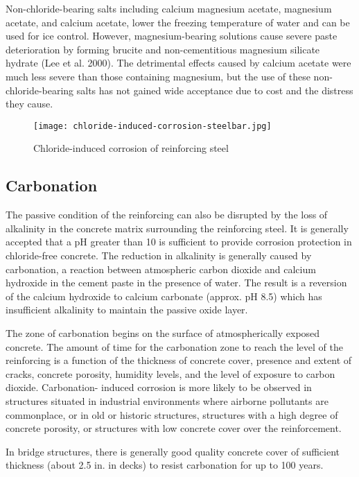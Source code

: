 Non-chloride-bearing salts including calcium magnesium acetate, magnesium acetate, and calcium acetate, lower
the freezing temperature of water and can be used for ice control.
 However, magnesium-bearing solutions cause
severe paste deterioration by forming brucite and non-cementitious magnesium silicate hydrate (Lee et al. 2000).
The detrimental effects caused by calcium acetate were much less severe than those containing magnesium, but the
use of these non-chloride-bearing salts has not gained wide acceptance due to cost and the distress they cause.

\begin{figure}
  \texttt{[image: chloride-induced-corrosion-steelbar.jpg]}
  \caption{Chloride-induced corrosion of reinforcing steel}
  \label{fig:chloride-induced-corrosion-steelbar}
\end{figure}
\subsection{Carbonation}
The passive condition of the reinforcing can also be disrupted by the loss of alkalinity in the concrete matrix
surrounding the reinforcing steel. It is generally accepted that a pH greater than 10 is sufficient to provide corrosion
protection in chloride-free concrete. The reduction in alkalinity is generally caused by carbonation, a reaction between atmospheric carbon dioxide and calcium hydroxide in the cement paste in the presence of water. The result
is a reversion of the calcium hydroxide to calcium carbonate (approx. pH 8.5) which has insufficient alkalinity to
maintain the passive oxide layer.

The zone of carbonation begins on the surface of atmospherically exposed concrete. The amount of time for the
carbonation zone to reach the level of the reinforcing is a function of the thickness of concrete cover, presence and
extent of cracks, concrete porosity, humidity levels, and the level of exposure to carbon dioxide.
 Carbonation-
induced corrosion is more likely to be observed in structures situated in industrial environments where airborne
pollutants are commonplace, or in old or historic structures, structures with a high degree of concrete porosity, or
structures with low concrete cover over the reinforcement.

In bridge structures, there is generally good quality concrete cover of sufficient thickness (about 2.5 in. in decks)
to resist carbonation for up to 100 years.

